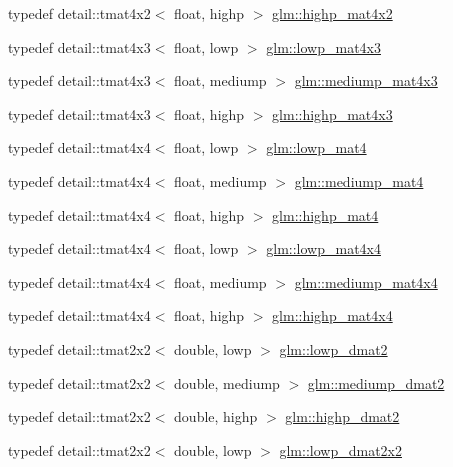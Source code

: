 \begin{DoxyCompactItemize}
\item 
typedef detail\+::tmat4x2$<$ float, highp $>$ \hyperlink{group__core__precision_gadf9c4a7947c2b0a79f52cc86a860f270}{glm\+::highp\+\_\+mat4x2}
\item 
typedef detail\+::tmat4x3$<$ float, lowp $>$ \hyperlink{group__core__precision_gada92d0baf15002240dd6f638c57f9fec}{glm\+::lowp\+\_\+mat4x3}
\item 
typedef detail\+::tmat4x3$<$ float, mediump $>$ \hyperlink{group__core__precision_ga445d8aac3a5227af2d1e98d5c2f74d03}{glm\+::mediump\+\_\+mat4x3}
\item 
typedef detail\+::tmat4x3$<$ float, highp $>$ \hyperlink{group__core__precision_gab8dfe989c5100c35ab5dec0e94f59d2a}{glm\+::highp\+\_\+mat4x3}
\item 
typedef detail\+::tmat4x4$<$ float, lowp $>$ \hyperlink{group__core__precision_ga8f6fef75ce51e9d6db7971478ad1f1c2}{glm\+::lowp\+\_\+mat4}
\item 
typedef detail\+::tmat4x4$<$ float, mediump $>$ \hyperlink{group__core__precision_gaf3de9a0400cf707d3c159f32902b92db}{glm\+::mediump\+\_\+mat4}
\item 
typedef detail\+::tmat4x4$<$ float, highp $>$ \hyperlink{group__core__precision_ga3067b3b8ce793227a51b2e3c233257d5}{glm\+::highp\+\_\+mat4}
\item 
typedef detail\+::tmat4x4$<$ float, lowp $>$ \hyperlink{group__core__precision_gad31846a0565c22a0479950313c28b218}{glm\+::lowp\+\_\+mat4x4}
\item 
typedef detail\+::tmat4x4$<$ float, mediump $>$ \hyperlink{group__core__precision_gacb51d2d10f7607617ac544f6db9a6eef}{glm\+::mediump\+\_\+mat4x4}
\item 
typedef detail\+::tmat4x4$<$ float, highp $>$ \hyperlink{group__core__precision_ga231950d260be295a25d7340e2020f55c}{glm\+::highp\+\_\+mat4x4}
\item 
typedef detail\+::tmat2x2$<$ double, lowp $>$ \hyperlink{group__core__precision_ga5e08c45dfef867e0326a1eee95060cd0}{glm\+::lowp\+\_\+dmat2}
\item 
typedef detail\+::tmat2x2$<$ double, mediump $>$ \hyperlink{group__core__precision_gac056ec9d1c37e591172544088163b7e4}{glm\+::mediump\+\_\+dmat2}
\item 
typedef detail\+::tmat2x2$<$ double, highp $>$ \hyperlink{group__core__precision_ga9b158b3b722fe991bb66f7e65f136e68}{glm\+::highp\+\_\+dmat2}
\item 
typedef detail\+::tmat2x2$<$ double, lowp $>$ \hyperlink{group__core__precision_ga68b486ff22814c1a3781378513a9fcc0}{glm\+::lowp\+\_\+dmat2x2}

\end{DoxyCompactItemize}
